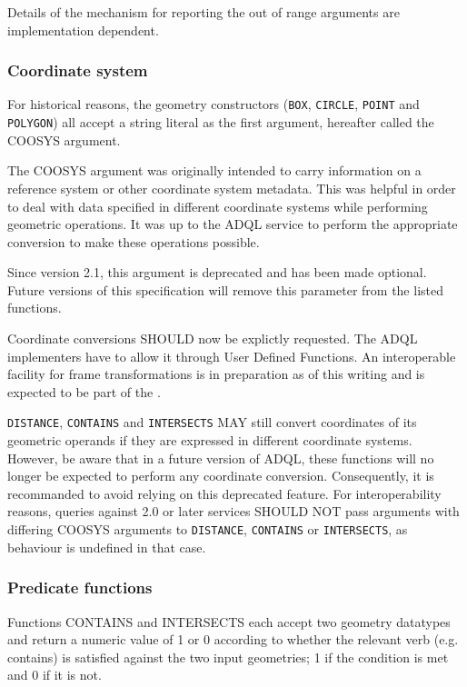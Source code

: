 \documentclass[11pt,a4paper]{ivoa}
\begin{document}
Details of the mechanism for reporting the out of range arguments are
implementation dependent.

\subsubsection{Coordinate system}
\label{sec:geom.coordsys.param}

For historical reasons, the geometry constructors (\verb:BOX:, \verb:CIRCLE:,
\verb:POINT: and \verb:POLYGON:) all accept a string literal as the first
argument, hereafter called the COOSYS argument.

The COOSYS argument was originally intended to carry information on
a reference system or other coordinate system metadata. This was helpful in
order to deal with data specified in different coordinate systems while
performing geometric operations. It was up to the ADQL service to perform
the appropriate conversion to make these operations possible.

Since version 2.1, this argument is deprecated and has been made optional.
Future versions of this specification will remove this parameter from the listed
functions.

Coordinate conversions SHOULD now be explictly requested. The ADQL implementers
have to allow it through User Defined Functions. An interoperable facility for
frame transformations is in preparation as of this writing and is expected to be
part of the \CatalogueUDF{}.

\verb:DISTANCE:, \verb:CONTAINS: and \verb:INTERSECTS: MAY still convert
coordinates of its geometric operands if they are expressed in different
coordinate systems. However, be aware that in a future version of ADQL, these
functions will no longer be expected to perform any coordinate conversion.
Consequently, it is recommanded to avoid relying on this deprecated feature.
For interoperability reasons, queries against 2.0 or later services SHOULD NOT
pass arguments with differing COOSYS arguments to \verb:DISTANCE:,
\verb:CONTAINS: or \verb:INTERSECTS:, as behaviour is undefined in that case.

\subsubsection{Predicate functions}
\label{sec:functions.geom.predicate}

Functions CONTAINS and INTERSECTS each accept two geometry datatypes
and return a numeric value of 1 or 0 according to whether the relevant
verb (e.g. contains) is satisfied against the two input geometries;
1 if the condition is met and 0 if it is not.
\end{document}
